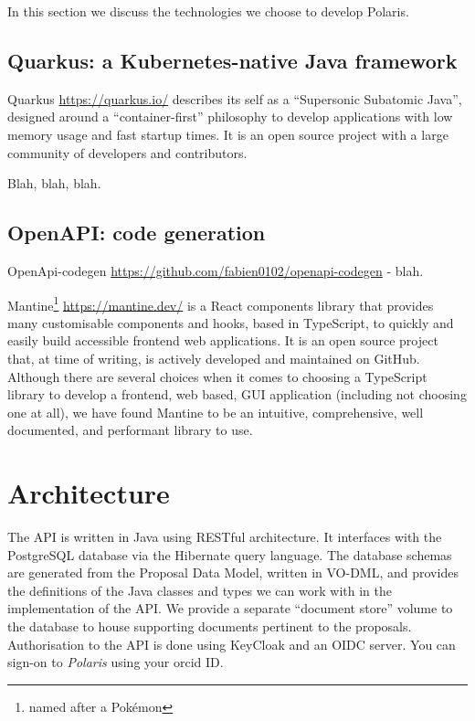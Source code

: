 \documentclass[11pt,twoside]{article}
\begin{document}
In this section we discuss the technologies we choose to develop Polaris.

\subsection{Quarkus: a Kubernetes-native Java framework}\label{subsec:quarkus}

Quarkus \url{https://quarkus.io/} describes its self as a ``Supersonic Subatomic Java'', designed around a
``container-first'' philosophy to develop applications with low memory usage and fast startup times.
It is an open source project with a large community of developers and contributors.

Blah, blah, blah.

\subsection{OpenAPI: code generation}\label{subsec:openapi-code-generation}

OpenApi-codegen \url{https://github.com/fabien0102/openapi-codegen}  - blah.


Mantine\footnote{named after a Pok\'emon} \url{https://mantine.dev/} is a React components library that
provides many customisable components and hooks, based in TypeScript, to quickly and easily build accessible
frontend web applications.
It is an open source project that, at time of writing, is actively developed and maintained on GitHub.
Although there are several choices when it comes to choosing a TypeScript library to develop a frontend,
web based, GUI application (including not choosing one at all), we have found Mantine to be an intuitive,
comprehensive, well documented, and performant library to use.


\section{Architecture}\label{sec:architecture}


The API is written in Java using RESTful architecture.
It interfaces with the PostgreSQL database via the Hibernate query language.
The database schemas are generated from the Proposal Data Model, written in VO-DML, and provides the
definitions of the Java classes and types we can work with in the implementation of the API\@.
We provide a separate ``document store'' volume to the database to house supporting documents pertinent
to the proposals.
Authorisation to the API is done using KeyCloak and an OIDC server.
You can sign-on to \emph{Polaris} using your orcid ID\@.
\end{document}
